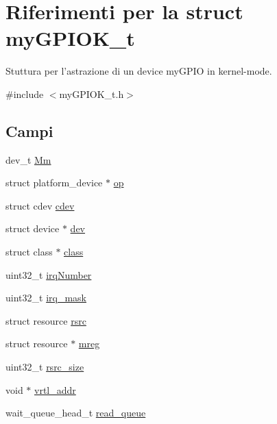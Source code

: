 \hypertarget{structmy_g_p_i_o_k__t}{\section{Riferimenti per la struct my\+G\+P\+I\+O\+K\+\_\+t}
\label{structmy_g_p_i_o_k__t}
}


Stuttura per l'astrazione di un device my\+G\+P\+I\+O in kernel-\/mode.  




{\ttfamily \#include $<$my\+G\+P\+I\+O\+K\+\_\+t.\+h$>$}

\subsection*{Campi}
\begin{DoxyCompactItemize}
\item 
dev\+\_\+t \hyperlink{structmy_g_p_i_o_k__t_aeb60fb4e41b5f11f70ebe969361884f4}{Mm}
\item 
struct platform\+\_\+device $\ast$ \hyperlink{structmy_g_p_i_o_k__t_a3a7801058bef8fbe4a2cec3c9579cd70}{op}
\item 
struct cdev \hyperlink{structmy_g_p_i_o_k__t_acba682fe45d5a1501790dbdb1d99bd6a}{cdev}
\item 
struct device $\ast$ \hyperlink{structmy_g_p_i_o_k__t_acf6a82c73e7a9d99293d9ce0b8837faf}{dev}
\item 
struct class $\ast$ \hyperlink{structmy_g_p_i_o_k__t_a9b6474dd18270738a5c4853fd93b5e70}{class}
\item 
uint32\+\_\+t \hyperlink{structmy_g_p_i_o_k__t_a42a1593ebe61611c4e29413903a373a5}{irq\+Number}
\item 
uint32\+\_\+t \hyperlink{structmy_g_p_i_o_k__t_a8ee102d0534084ca58a9cf9b8a3d9cc9}{irq\+\_\+mask}
\item 
struct resource \hyperlink{structmy_g_p_i_o_k__t_a565a1848c3ae8026257a74cf169c6941}{rsrc}
\item 
struct resource $\ast$ \hyperlink{structmy_g_p_i_o_k__t_a18c4eb95350c67ccb239a8a39c43c09a}{mreg}
\item 
uint32\+\_\+t \hyperlink{structmy_g_p_i_o_k__t_a0f87b53dc5049a349ef01aa586c0b5dc}{rsrc\+\_\+size}
\item 
void $\ast$ \hyperlink{structmy_g_p_i_o_k__t_af5aef493b3c2bc9d1f036ce0acea9bba}{vrtl\+\_\+addr}
\item 
wait\+\_\+queue\+\_\+head\+\_\+t \hyperlink{structmy_g_p_i_o_k__t_a251570f8e6976ad87411093e330e7b4f}{read\+\_\+queue}

\end{DoxyCompactItemize}
